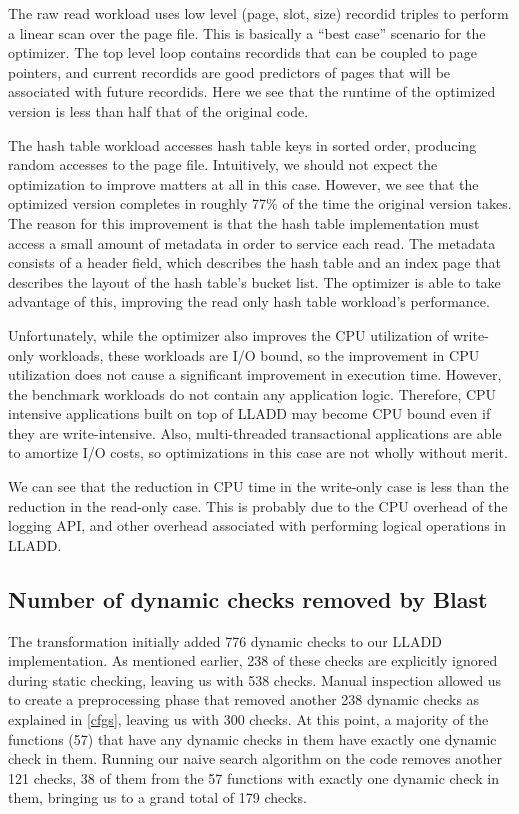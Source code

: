 \documentclass[10pt,letterpaper,twocolumn,english]{article}
\newcommand{\yad}{LLADD\xspace}
\begin{document}
The raw read workload uses low level (page, slot, size) recordid
triples to perform a linear scan over the page file.  This is
basically a ``best case'' scenario for the optimizer.  The top level
loop contains recordids that can be coupled to page pointers, and
current recordids are good predictors of pages that will be associated
with future recordids.  Here we see that the runtime of the optimized
version is less than half that of the original code.

The hash table workload accesses hash table keys in sorted order,
producing random accesses to the page file.  Intuitively, we should not
expect the optimization to improve matters at all in this case.
However, we see that the optimized version completes in roughly 77\%
of the time the original version takes.  The reason for this
improvement is that the hash table implementation must access a small
amount of metadata in order to service each read.  The metadata
consists of a header field, which describes the hash table and an
index page that describes the layout of the hash table's bucket list.
The optimizer is able to take advantage of this, improving the
read only hash table workload's performance.

Unfortunately, while the optimizer also improves the CPU utilization of
write-only workloads, these workloads are I/O bound, so the
improvement in CPU utilization does not cause a significant improvement
in execution time.  However, the benchmark workloads do not contain
any application logic.  Therefore, CPU intensive applications built
on top of \yad may become CPU bound even if they are write-intensive.  Also,
multi-threaded transactional applications are able to amortize I/O
costs, so optimizations in this case are not wholly without merit.

We can see that the reduction in CPU time in the write-only case is
less than the reduction in the read-only case.  This is probably due
to the CPU overhead of the logging API, and other overhead associated
with performing logical operations in \yad. 



\subsection{Number of dynamic checks removed by Blast}
The transformation initially added 776 dynamic checks to our LLADD implementation.  As mentioned earlier, 238 of these checks are explicitly ignored during static checking, leaving us with 538 checks.  Manual inspection allowed us to create a preprocessing phase that removed another 238 dynamic checks as explained in \ref{cfgs}, leaving us with 300 checks.  At this point, a majority of the functions (57) that have any dynamic checks in them have exactly one dynamic check in them.  Running our naive search algorithm on the code removes another 121 checks, 38 of them from the 57 functions with exactly one dynamic check in them, bringing us to a grand total of 179 checks.
\end{document}
